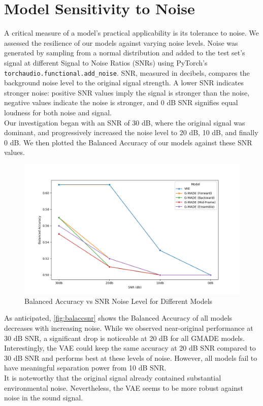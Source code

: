 \section{Model Sensitivity to Noise}
A critical measure of a model's practical applicability is its tolerance to noise. We assessed the resilience of our models against varying noise levels. Noise was generated by sampling from a normal distribution and added to the test set's signal at different Signal to Noise Ratios (SNRs) using PyTorch's \lstinline{torchaudio.functional.add_noise}. SNR, measured in decibels, compares the background noise level to the original signal strength. A lower SNR indicates stronger noise: positive SNR values imply the signal is stronger than the noise, negative values indicate the noise is stronger, and 0 dB SNR signifies equal loudness for both noise and signal.\\
Our investigation began with an SNR of 30 dB, where the original signal was dominant, and progressively increased the noise level to 20 dB, 10 dB, and finally 0 dB. We then plotted the Balanced Accuracy of our models against these SNR values.
\begin{figure}[h!]
    \includegraphics[width=\linewidth]{images/snr_balacc}
    \caption{
    Balanced Accuracy vs SNR Noise Level for Different Models
}
\label{fig:balaccsnr}
\end{figure}

As anticipated, \autoref{fig:balaccsnr} shows the Balanced Accuracy of all models decreases with increasing noise. While we observed near-original performance at 30 dB SNR, a significant drop is noticeable at 20 dB for all GMADE models. Interestingly, the VAE could keep the same accuracy at 20 dB SNR compared to 30 dB SNR and performs best at these levels of noise. However, all models fail to have meaningful separation power from 10 dB SNR.\\
It is noteworthy that the original signal already contained substantial environmental noise. Nevertheless, the VAE seems to be more robust against noise in the sound signal.
